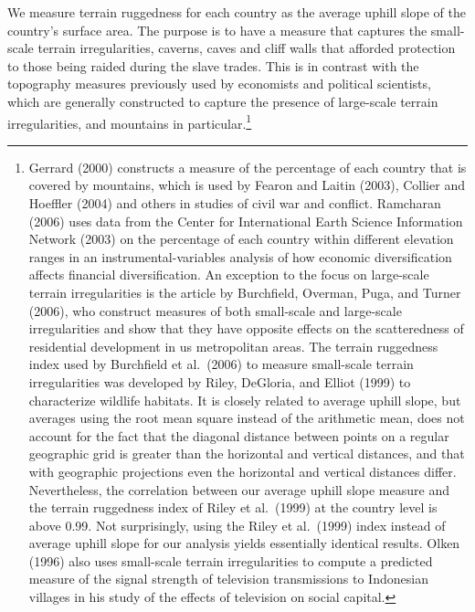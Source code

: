 \documentclass[
  letterpaper,
  DIV=11,
  numbers=noendperiod]{scrartcl}
\begin{document}
We measure terrain ruggedness for each country as the average uphill
slope of the country's surface area. The purpose is to have a measure
that captures the small-scale terrain irregularities, caverns, caves and
cliff walls that afforded protection to those being raided during the
slave trades. This is in contrast with the topography measures
previously used by economists and political scientists, which are
generally constructed to capture the presence of large-scale terrain
irregularities, and mountains in particular.\footnote{Gerrard (2000)
  constructs a measure of the percentage of each country that is covered
  by mountains, which is used by Fearon and Laitin (2003), Collier and
  Hoeffler (2004) and others in studies of civil war and conflict.
  Ramcharan (2006) uses data from the Center for International Earth
  Science Information Network (2003) on the percentage of each country
  within different elevation ranges in an instrumental-variables
  analysis of how economic diversification affects financial
  diversification. An exception to the focus on large-scale terrain
  irregularities is the article by Burchfield, Overman, Puga, and Turner
  (2006), who construct measures of both small-scale and large-scale
  irregularities and show that they have opposite effects on the
  scatteredness of residential development in us metropolitan areas. The
  terrain ruggedness index used by Burchfield et al.~(2006) to measure
  small-scale terrain irregularities was developed by Riley, DeGloria,
  and Elliot (1999) to characterize wildlife habitats. It is closely
  related to average uphill slope, but averages using the root mean
  square instead of the arithmetic mean, does not account for the fact
  that the diagonal distance between points on a regular geographic grid
  is greater than the horizontal and vertical distances, and that with
  geographic projections even the horizontal and vertical distances
  differ. Nevertheless, the correlation between our average uphill slope
  measure and the terrain ruggedness index of Riley et al.~(1999) at the
  country level is above 0.99. Not surprisingly, using the Riley et
  al.~(1999) index instead of average uphill slope for our analysis
  yields essentially identical results. Olken (1996) also uses
  small-scale terrain irregularities to compute a predicted measure of
  the signal strength of television transmissions to Indonesian villages
  in his study of the effects of television on social capital.}
\end{document}

